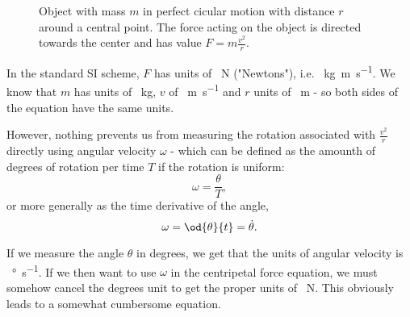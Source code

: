 \begin{figure}
  \begin{center}
  \end{center}
  \caption{Object with mass $m$ in perfect cicular motion with distance $r$ around a central point. The force acting on the object is directed towards the center and has value $F=m\frac{v^{2}}{r}$.}
  \label{fig:centripetal_force}
\end{figure}

In the standard SI scheme, $F$ has units of \SI{}{\newton} ("Newtons"), i.e. \SI{}{\kilo\gram\meter\per\second}. We know that $m$ has units of \SI{}{\kilo\gram}, $v$ of \SI{}{\meter\per\second} and $r$ units of \SI{}{\meter} - so both sides of the equation have the same units.

However, nothing prevents us from measuring the rotation associated with $\frac{v^{2}}{r}$ directly using angular velocity $\omega$ - which can be defined as the amounth of degrees of rotation per time $T$ if the rotation is uniform:
\begin{equation}
  \omega = \frac{\theta}{T},
  \label{eq:angular_velocity_constant}
\end{equation}
or more generally as the time derivative of the angle,
\begin{equation}
  \omega = \od{\theta}{t} = \dot{\theta}.
  \label{eq:angular_velocity_as_derivative}
\end{equation}

If we measure the angle $\theta$ in degrees, we get that the units of angular velocity is \SI{}{\degree\per\second}. If we then want to use $\omega$ in the centripetal force equation, we must somehow cancel the degrees unit to get the proper units of \SI{}{\newton}. This obviously leads to a somewhat cumbersome equation.

